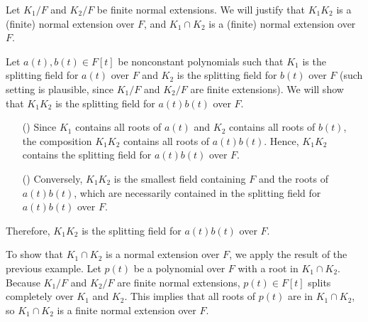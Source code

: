 \begin{exmp}
    Let $K_1/F$ and $K_2/F$ be finite normal extensions.
    We will justify that $K_1K_2$ is a (finite) normal extension over $F$, and $K_1\cap K_2$ is a (finite) normal extension over $F$.

    Let $a(t), b(t)\in F[t]$ be nonconstant polynomials such that $K_1$ is the splitting field for $a(t)$ over $F$ and $K_2$ is the splitting field for $b(t)$ over $F$ (such setting is plausible, since $K_1/F$ and $K_2/F$ are finite extensions).
    We will show that $K_1K_2$ is the splitting field for $a(t)b(t)$ over $F$.
    \begin{enumerate}
        \item[(\romannumeral 1)]
        {
            Since $K_1$ contains all roots of $a(t)$ and $K_2$ contains all roots of $b(t)$, the composition $K_1K_2$ contains all roots of $a(t)b(t)$.
            Hence, $K_1K_2$ contains the splitting field for $a(t)b(t)$ over $F$.
        }
        \item[(\romannumeral 2)]
        {
            Conversely, $K_1K_2$ is the smallest field containing $F$ and the roots of $a(t)b(t)$, which are necessarily contained in the splitting field for $a(t)b(t)$ over $F$.
        }
    \end{enumerate}
    Therefore, $K_1K_2$ is the splitting field for $a(t)b(t)$ over $F$.

    To show that $K_1\cap K_2$ is a normal extension over $F$, we apply the result of the previous example.
    Let $p(t)$ be a polynomial over $F$ with a root in $K_1\cap K_2$.
    Because $K_1/F$ and $K_2/F$ are finite normal extensions, $p(t)\in F[t]$ splits completely over $K_1$ and $K_2$.
    This implies that all roots of $p(t)$ are in $K_1\cap K_2$, so $K_1\cap K_2$ is a finite normal extension over $F$.
\end{exmp}